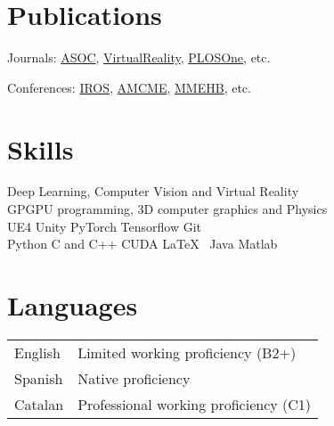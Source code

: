 \documentclass[]{deedy-resume-openfont}
\begin{document}
\begin{minipage}[t]{0.495\textwidth}
\sectionsep

\section{Publications}
\vspace{\topsep}
\begin{tightemize}
\item Journals: \href{https://www.sciencedirect.com/science/article/pii/S1568494618302813}{ ASOC}, \href{https://arxiv.org/abs/1704.06857}{ VirtualReality}, \href{http://journals.plos.org/plosone/article?id=10.1371/journal.pone.0164694}{ PLOSOne}, etc.

\item Conferences: \href{https://ieeexplore.ieee.org/stamp/stamp.jsp?tp=&arnumber=8594495}{ IROS}, \href{http://www.inase.org/library/2015/barcelona/bypaper/AMCME/AMCME-06.pdf}{ AMCME}, \href{https://ieeexplore.ieee.org/document/7965885}{ MMEHB}, etc. 
\end{tightemize}

\section{Skills}
Deep Learning, Computer Vision and Virtual Reality \\
\sectionsep
{}
GPGPU programming, 3D computer graphics and Physics \\
\sectionsep
{}
UE4 \textbullet{} Unity \textbullet{} PyTorch \textbullet{} Tensorflow \textbullet{} Git \\
\sectionsep
{}
Python \textbullet{} C and C++ \textbullet{} CUDA \textbullet{} \LaTeX\ \textbullet{} Java \textbullet{} Matlab \\


\section{Languages}
\begin{tabular}{ll}
English & Limited working proficiency (B2+)\\
Spanish & Native proficiency \\ 
Catalan & Professional working proficiency (C1)\\ 
\end{tabular}

\end{minipage} 
\end{document}
